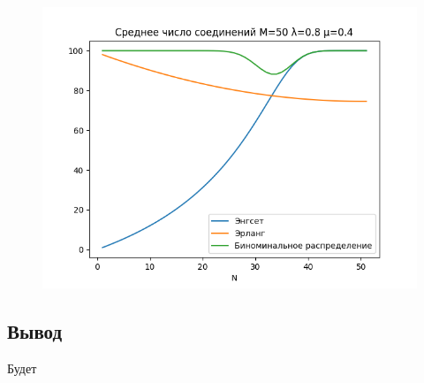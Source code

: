 \documentclass[12pt]{article}
\let\Oldsubsection\subsection
\renewcommand{\subsection}{\FloatBarrier\Oldsubsection}
\begin{document}
\begin{figure}[!htb]
\centering
\includegraphics[scale=1.00]{assets/iss_4/aver_conn_M50_lam08_mu04.png}
\caption{}
\label{}
\end{figure}

\subsection{Вывод}
Будет
\end{document}
